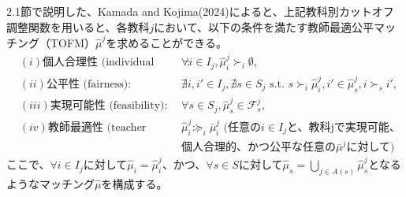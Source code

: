 \documentclass[12pt, a4paper]{article}
\theoremstyle{definition}
\theoremstyle{remark}
\theoremstyle{plain}
\begin{document}




2.1節で説明した、Kamada and Kojima(2024)によると、上記教科別カットオフ調整関数を用いると、各教科$j$において、以下の条件を満たす教師最適公平マッチング（TOFM）$\hat{\mu}^j$を求めることができる。
\begin{align*}
 &(i) \text{個人合理性 (individual rationality)}: && \forall i \in I_j, \hat{\mu}^j_i \succ_i \emptyset,\\
 &(ii) \text{公平性 (fairness)}:  && \nexists i, i' \in I_j, \nexists s \in S_j \text{ s.t. } s \succ_i \hat{\mu}^j_i, i' \in \hat{\mu}^j_s, i \succ_s i',\\
 &(iii) \text{実現可能性 (feasibility)}:  && \forall s \in S_j, \hat{\mu}^j_s \in \mathcal{F}^j_s,\\
 &(iv) \text{教師最適性 (teacher optimality)}: && \hat{\mu}^j_i \succeq_i \bar{\mu}^j_i \text{ (任意の$i \in I_j$と、教科jで実現可能、}\\
 & && \text{個人合理的、かつ公平な任意の$\bar{\mu}^j$に対して)}
\end{align*}
ここで、$\forall i \in I_j$に対して$\hat{\mu}_i=\hat{\mu}^j_i$、かつ、$\forall s \in S$に対して$\hat{\mu}_s = \bigcup\limits_{j \in A(s)} \hat{\mu}^j_s$となるようなマッチング$\hat{\mu}$を構成する。
\end{document}
